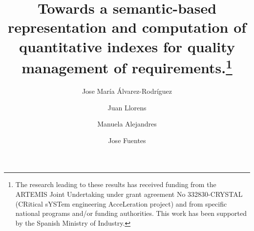 \documentclass{llncs}
\begin{document}
\title{Towards a semantic-based representation and computation of quantitative indexes for quality management of requirements.\thanks{The research leading to these results has received funding from the ARTEMIS Joint Undertaking under
grant agreement No 332830-CRYSTAL (CRitical sYSTem engineering AcceLeration project) and from specific national programs and/or funding authorities. This work has been supported by the Spanish Ministry of Industry.}}

\author{Jose Mar\'{i}a \'{A}lvarez-Rodr\'{i}guez \and Juan Llorens  \and Manuela Alejandres \and Jose Fuentes}






\date{}

\maketitle
\end{document}
